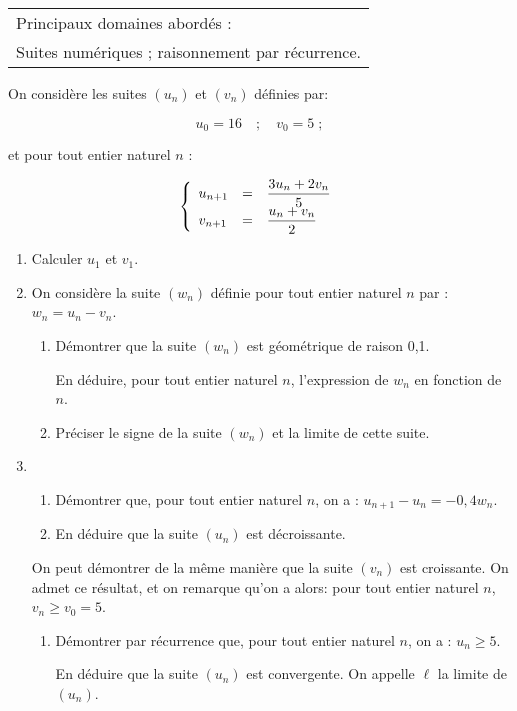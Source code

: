 
\medskip

\begin{tabular}{|l|}\hline
Principaux domaines abordés :\\
Suites numériques ; raisonnement par récurrence.\\ \hline
\end{tabular}

\medskip

On considère les suites $\left(u_n\right)$ et $\left(v_n\right)$ définies par:

\[u_0 = 16 \quad ;\quad  v_0 = 5 \;;\]

et pour tout entier naturel $n$ :

\renewcommand\arraystretch{2}
\[\left\{\begin{array}{l c l}
u_{n+1}&=&\dfrac{3u_n + 2v_n}{5}\\
v_{n+1}&=& \dfrac{u_n + v_n}{2}
\end{array}\right.\]
\renewcommand\arraystretch{1}

\smallskip

\begin{enumerate}
\item Calculer $u_1$ et $v_1$.
\item On considère la suite $\left(w_n\right)$ définie pour tout entier naturel $n$ par : $w_n = u_n - v_n$.
	\begin{enumerate}
		\item Démontrer que la suite $\left(w_n\right)$ est géométrique de raison 0,1.
		
En déduire, pour tout entier naturel $n$, l'expression de $w_n$ en fonction de $n$.
		\item Préciser le signe de la suite $\left(w_n\right)$  et la limite de cette suite.
	\end{enumerate}
\item 
	\begin{enumerate}
		\item Démontrer que, pour tout entier naturel $n$, on a : $u_{n+1} - u_n = - 0,4 w_n$.
		\item En déduire que la suite $\left(u_n\right)$ est décroissante.

\end{enumerate}
		
On peut démontrer de la même manière que la suite $\left(v_n\right)$ est croissante. On admet ce résultat, et on remarque qu'on a alors: pour tout entier naturel $n$,\, $v_n \geqslant v_0 = 5$.
\begin{enumerate}[resume]
		\item Démontrer par récurrence que, pour tout entier naturel $n$, on a : $u_n \geqslant 5$. 
		
En déduire que la suite $\left(u_n\right)$ est convergente. On appelle $\ell$ la limite de $\left(u_n\right)$.
	\end{enumerate}
\end{enumerate}
	

